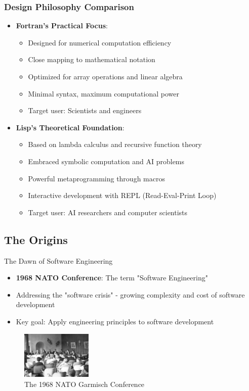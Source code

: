\documentclass{beamer}
\begin{document}
\begin{frame}[t]
\frametitle{Design Philosophy Comparison}
\begin{itemize}
    \item \textbf{Fortran's Practical Focus}:
    \begin{itemize}
        \item Designed for numerical computation efficiency
        \item Close mapping to mathematical notation
        \item Optimized for array operations and linear algebra
        \item Minimal syntax, maximum computational power
        \item Target user: Scientists and engineers
    \end{itemize}
    
    \item \textbf{Lisp's Theoretical Foundation}:
    \begin{itemize}
        \item Based on lambda calculus and recursive function theory
        \item Embraced symbolic computation and AI problems
        \item Powerful metaprogramming through macros
        \item Interactive development with REPL (Read-Eval-Print Loop)
        \item Target user: AI researchers and computer scientists
    \end{itemize}
\end{itemize}
\end{frame}


\subsection{The Origins}

\begin{frame}[t]{The Dawn of Software Engineering}
\begin{itemize}
    \item \textbf{1968 NATO Conference}: The term "Software Engineering" 
    \item Addressing the "software crisis" - growing complexity and cost of software development
    \item Key goal: Apply engineering principles to software development
\end{itemize}
    \begin{figure}[b]
        \centering
        \includegraphics[width=0.3\textwidth]{images/NATO-conference-photo.png}
        \caption{The 1968 NATO Garmisch Conference}
    \end{figure}
\end{frame}
\end{document}
